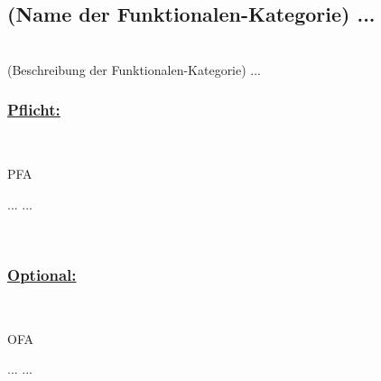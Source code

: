%
%


\subsection{(Name der Funktionalen-Kategorie) ...}

%
%
\renewcommand{\K}{}
%
%

~\\
(Beschreibung der Funktionalen-Kategorie) ...
\\

%
%
\subsubsection*{\underline{Pflicht:}}~\\

\begin{ids}{\gls{PFA\K}}

	\id[ 1] ...
 	\id[10] ...
	
\end{ids}

~\\


%
%
\subsubsection*{\underline{Optional:}}~\\


\begin{ids}{\gls{OFA\K}}

	\id[ 11] ...
 	\id[100] ...
	
\end{ids}

~\\